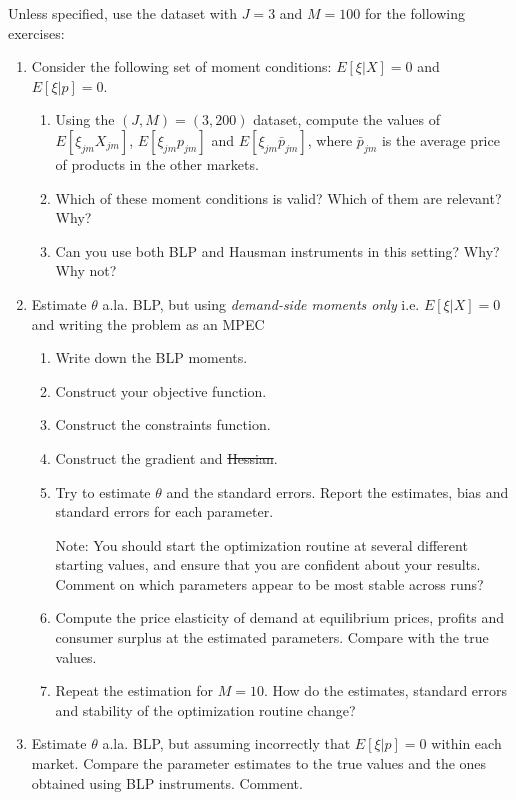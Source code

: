 \documentclass[12pt ]{article}
\providecommand{\DIFadd}[1]{{\protect\color{blue}\uwave{#1}}} %
\providecommand{\DIFdel}[1]{{\protect\color{red}\sout{#1}}}                      %
\providecommand{\DIFaddbegin}{} %
\providecommand{\DIFaddend}{} %
\providecommand{\DIFdelbegin}{} %
\providecommand{\DIFdelend}{} %
\begin{document}
Unless specified, use the dataset with $J=3$ and $M=100$ for the
following exercises:

\begin{enumerate}[1.]
\item Consider the following set of moment conditions: $E[\xi|X]=0$ and
  $E[\xi|p]=0$.
  \begin{enumerate}
  \item Using the $(J,M)=(3,200)$ dataset, compute the values of
    $E[\xi_{jm}X_{jm}]$, $E[\xi_{jm}p_{jm}]$ and
    $E[\xi_{jm}\bar{p}_{jm}]$, where $\bar{p}_{jm}$ is the average
    price of products in the other markets.
  \item Which of these moment conditions is valid? Which of them are relevant?
    Why?
  \item Can you use both BLP and Hausman instruments in this
    setting? Why? Why not?
  \end{enumerate}
\item Estimate $\theta$ a.la. BLP, but using \emph{demand-side
    moments only} i.e. $E[\xi|X]=0$ and writing the problem as an MPEC
  \begin{enumerate}
  \item Write down the BLP moments.
  \item Construct your objective function.
  \item Construct the constraints function.
  \item Construct the gradient and \DIFdelbegin \DIFdel{Hessian}\DIFdelend \DIFaddbegin \DIFadd{Jacobian}\DIFaddend .
  \item Try to estimate $\theta$ and the standard errors. Report the
    estimates, bias and standard errors for each parameter.

    Note: You should start the optimization routine at several
    different starting values, and ensure that you are confident about
    your results. Comment on which parameters appear to be most stable across
    runs?

  \item Compute the price elasticity of demand at equilibrium prices,
    profits and consumer surplus at the estimated parameters. Compare
    with the true values.
  \item Repeat the estimation for $M=10$. How do the estimates,
    standard errors and stability of the optimization routine change?
  \end{enumerate}
\item Estimate $\theta$ a.la. BLP, but assuming incorrectly that $E[\xi|p]=0$
  within each market. Compare the parameter estimates to the true
  values and the ones obtained using BLP instruments. Comment.
\end{enumerate}
\end{document}
